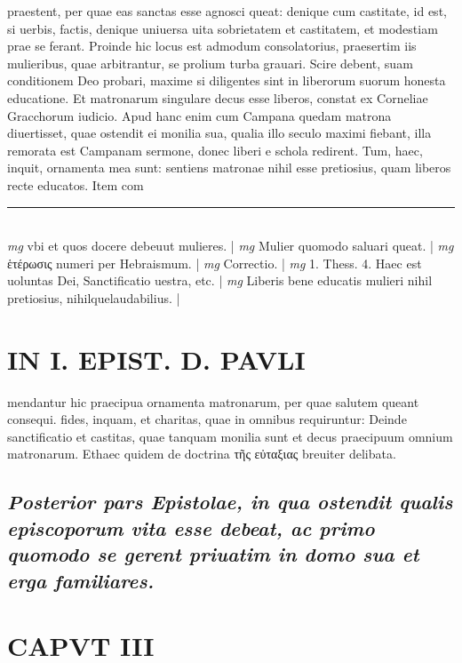 \documentclass{article}
\begin{document}
\begin{pages}
praestent, per quae eas sanctas esse agnosci queat: denique  cum castitate, id est, si uerbis, factis, denique  uniuersa uita sobrietatem et castitatem, et modestiam prae se ferant. Proinde hic locus est admodum consolatorius, praesertim iis mulieribus, quae arbitrantur, se prolium turba grauari. Scire debent, suam conditionem Deo probari, maxime si diligentes sint in liberorum suorum honesta educatione. Et matronarum singulare decus esse liberos, constat ex Corneliae Gracchorum iudicio. Apud hanc enim cum Campana quedam matrona diuertisset, quae ostendit ei monilia sua, qualia illo seculo maximi fiebant, illa remorata est Campanam sermone, donec liberi e schola redirent. Tum, haec, inquit, ornamenta mea sunt: sentiens matronae nihil esse pretiosius, quam liberos recte educatos. Item com  \pend
\vspace{0.5cm}\noindent
\vspace{0.2cm}\rule{1cm}{0.2pt}\\ 
\hspace{0.2cm}\textit{mg}
\footnotesize vbi  et quos docere debeuut mulieres. 
\normalsize| 
\hspace{0.2cm}\textit{mg}
\footnotesize Mulier quomodo saluari queat. 
\normalsize| 
\hspace{0.2cm}\textit{mg}
\footnotesize ἑτέρωσις numeri per Hebraismum. 
\normalsize| 
\hspace{0.2cm}\textit{mg}
\footnotesize Correctio. 
\normalsize| 
\hspace{0.2cm}\textit{mg}
\footnotesize 1. Thess. 4. Haec est uoluntas Dei, Sanctificatio uestra, etc. 
\normalsize| 
\hspace{0.2cm}\textit{mg}
\footnotesize Liberis bene educatis mulieri nihil pretiosius, nihilquelaudabilius. 
\normalsize| 
\section*{IN I. EPIST. D. PAVLI }
\marginpar{[ p.74 ]}\pstart mendantur hic praecipua ornamenta matronarum, per quae salutem queant consequi. fides, inquam, et charitas, quae in omnibus requiruntur: Deinde sanctificatio et castitas, quae tanquam monilia sunt et decus praecipuum omnium matronarum. Ethaec quidem de doctrina τῆς εὐταξιας  breuiter delibata.  \pend
{}
{}
\subsection*{\textit{Posterior pars Epistolae, in qua ostendit qualis episcoporum vita esse debeat, ac primo quomodo se gerent priuatim in domo sua et erga familiares. }}
\endnumbering\beginnumbering\section{CAPVT III}
{}

\end{pages}
\end{document}
